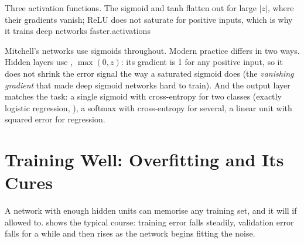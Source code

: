 %
{Three activation functions. The sigmoid and tanh flatten out for large $|z|$, where their
gradients vanish; ReLU does not saturate for positive inputs, which is why it trains deep
networks faster.}{activations}

Mitchell's networks use sigmoids throughout. Modern practice differs in two ways.
Hidden layers use , $\max(0, z)$: its gradient is 1 for any positive
input, so it does not shrink the error signal the way a saturated sigmoid does
(the \emph{vanishing gradient} that made deep sigmoid networks hard to train). And
the output layer matches the task: a single sigmoid with cross-entropy for two
classes (exactly logistic regression, ), a softmax with cross-entropy
for several, a linear unit with squared error for regression.

\section{Training Well: Overfitting and Its Cures}

A network with enough hidden units can memorise any training set, and it will if
allowed to.  shows the typical course: training error falls
steadily, validation error falls for a while and then rises as the network begins
fitting the noise.


